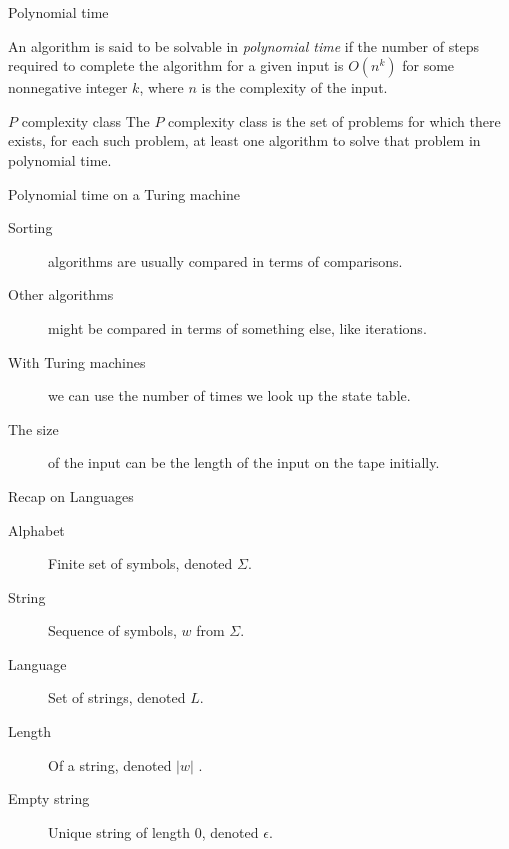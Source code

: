 \begin{frame}{Polynomial time}
  \begin{definition}
  An algorithm is said to be solvable in \emph{polynomial time} if the number of steps required to complete the algorithm for a given input is $O(n^k)$ for some nonnegative integer $k$, where $n$ is the complexity of the input.
  \end{definition}
  
  \vspace{0.5cm}
  \begin{block}{$P$ complexity class}
  The $P$ complexity class is the set of problems for which there exists, for each such problem, at least one algorithm to solve that problem in polynomial time.
  \end{block}

\end{frame}



\begin{frame}{Polynomial time on a Turing machine}
  \begin{description}
    \item[Sorting] algorithms are usually compared in terms of comparisons.
    \item[Other algorithms] might be compared in terms of something else, like iterations.
    \item[With Turing machines] we can use the number of times we look up the state table.
    \item[The size] of the input can be the length of the input on the tape initially.
  \end{description}
\end{frame}




\begin{frame}{Recap on Languages}
  \begin{description}
    \item[Alphabet] Finite set of symbols, denoted $\Sigma$.
    \item[String] Sequence of symbols, $w$ from $\Sigma$.
    \item[Language] Set of strings, denoted $L$.
    \item[Length] Of a string, denoted $|w|$  .
    \item[Empty string] Unique string of length 0, denoted $\epsilon$.
  \end{description}
\end{frame}



